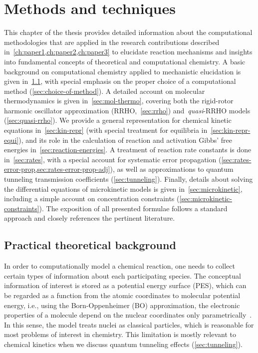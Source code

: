 \chapter{Methods and techniques}%
\label{ch:methods}

This chapter of the thesis provides detailed information about the computational methodologies
that are applied in the research contributions described in~\cref{ch:paper1,ch:paper2,ch:paper3}
to elucidate reaction mechanisms and insights into fundamental concepts of theoretical and computational chemistry.
A basic background on computational chemistry applied to mechanistic elucidation is given in~\cref{sec:background-methods},
with special emphasis on the proper choice of a computational method (\cref{sec:choice-of-method}).
A detailed account on molecular thermodynamics is given in~\cref{sec:mol-thermo},
covering both the rigid-rotor harmonic oscillator approximation (RRHO,~\cref{sec:rrho}) and~\emph{quasi}-RRHO models (\cref{sec:quasi-rrho}).
We provide a general representation for chemical kinetic equations in~\cref{sec:kin-repr} (with special treatment for equilibria in~\cref{sec:kin-repr-equi}),
and its role in the calculation of reaction and activation Gibbs' free energies in~\cref{sec:reaction-energies}.
A treatment of reaction rate constants is done in~\cref{sec:rates},
with a special account for systematic error propagation (\cref{sec:rates-error-prop,sec:rates-error-prop-adj}),
as well as approximations to quantum tunneling transmission coefficients (\cref{sec:tunneling}).
Finally,
details about solving the differential equations of microkinetic models is given in~\cref{sec:microkinetic},
including a simple account on concentration constraints (\cref{sec:microkinetic-constraints}).
The exposition of all presented formulae follows a standard approach and closely references the pertinent literature.

\section{Practical theoretical background}%
\label{sec:background-methods}

In order to computationally model a chemical reaction,
one needs to collect certain types of information about each participating species.
The conceptual information of interest is stored as a potential energy surface (PES),
which can be regarded as a function from the atomic coordinates to molecular potential energy,
i.e.,
using the Born-Oppenheimer (BO) approximation,
the electronic properties of a molecule depend on the nuclear coordinates
only parametrically~\cite{Born_1927}.
In this sense,
the model treats nuclei as classical particles,
which is reasonable for most problems of interest in chemistry.
This limitation is mostly relevant to chemical kinetics when we discuss quantum tunneling effects (\cref{sec:tunneling}).

